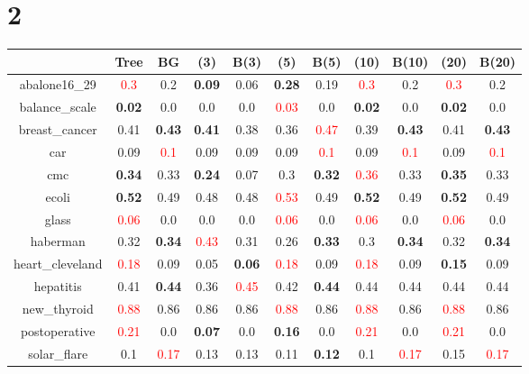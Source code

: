 \documentclass{article}%
\begin{document}
\section*{2}%
\begin{tabular}{c|cccccccccc}%
\hline%
&Tree&BG&(3)&B(3)&(5)&B(5)&(10)&B(10)&(20)&B(20)\\%
\hline%
abalone16\_29&\textcolor{red}{ 
0.3
}&0.2&\textbf{0.09}&0.06&\textbf{0.28}&0.19&\textcolor{red}{ 
0.3
}&0.2&\textcolor{red}{ 
0.3
}&0.2\\%
\hline%
balance\_scale&\textbf{0.02}&0.0&0.0&0.0&\textcolor{red}{ 
0.03
}&0.0&\textbf{0.02}&0.0&\textbf{0.02}&0.0\\%
\hline%
breast\_cancer&0.41&\textbf{0.43}&\textbf{0.41}&0.38&0.36&\textcolor{red}{ 
0.47
}&0.39&\textbf{0.43}&0.41&\textbf{0.43}\\%
\hline%
car&0.09&\textcolor{red}{ 
0.1
}&0.09&0.09&0.09&\textcolor{red}{ 
0.1
}&0.09&\textcolor{red}{ 
0.1
}&0.09&\textcolor{red}{ 
0.1
}\\%
\hline%
cmc&\textbf{0.34}&0.33&\textbf{0.24}&0.07&0.3&\textbf{0.32}&\textcolor{red}{ 
0.36
}&0.33&\textbf{0.35}&0.33\\%
\hline%
ecoli&\textbf{0.52}&0.49&0.48&0.48&\textcolor{red}{ 
0.53
}&0.49&\textbf{0.52}&0.49&\textbf{0.52}&0.49\\%
\hline%
glass&\textcolor{red}{ 
0.06
}&0.0&0.0&0.0&\textcolor{red}{ 
0.06
}&0.0&\textcolor{red}{ 
0.06
}&0.0&\textcolor{red}{ 
0.06
}&0.0\\%
\hline%
haberman&0.32&\textbf{0.34}&\textcolor{red}{ 
0.43
}&0.31&0.26&\textbf{0.33}&0.3&\textbf{0.34}&0.32&\textbf{0.34}\\%
\hline%
heart\_cleveland&\textcolor{red}{ 
0.18
}&0.09&0.05&\textbf{0.06}&\textcolor{red}{ 
0.18
}&0.09&\textcolor{red}{ 
0.18
}&0.09&\textbf{0.15}&0.09\\%
\hline%
hepatitis&0.41&\textbf{0.44}&0.36&\textcolor{red}{ 
0.45
}&0.42&\textbf{0.44}&0.44&0.44&0.44&0.44\\%
\hline%
new\_thyroid&\textcolor{red}{ 
0.88
}&0.86&0.86&0.86&\textcolor{red}{ 
0.88
}&0.86&\textcolor{red}{ 
0.88
}&0.86&\textcolor{red}{ 
0.88
}&0.86\\%
\hline%
postoperative&\textcolor{red}{ 
0.21
}&0.0&\textbf{0.07}&0.0&\textbf{0.16}&0.0&\textcolor{red}{ 
0.21
}&0.0&\textcolor{red}{ 
0.21
}&0.0\\%
\hline%
solar\_flare&0.1&\textcolor{red}{ 
0.17
}&0.13&0.13&0.11&\textbf{0.12}&0.1&\textcolor{red}{ 
0.17
}&0.15&\textcolor{red}{ 
0.17
}\\%

\end{tabular}
\end{document}
